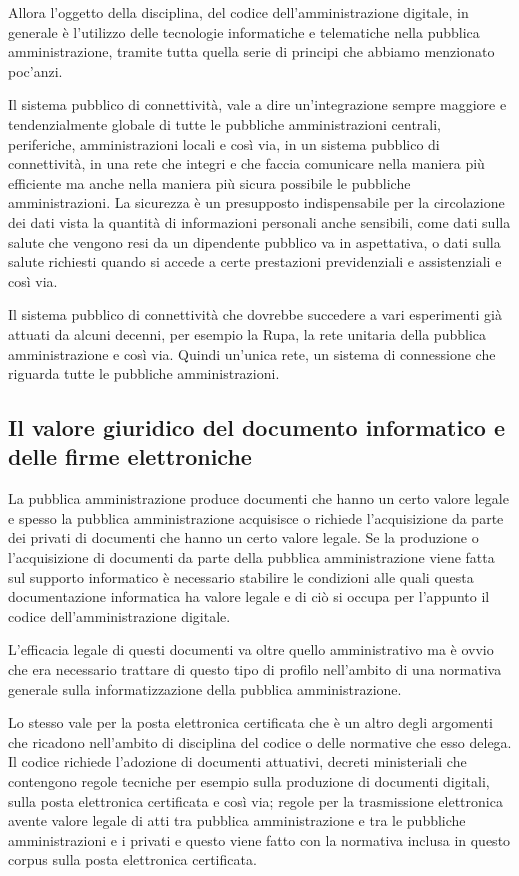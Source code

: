 Allora l'oggetto della disciplina, del codice dell'amministrazione digitale, in generale è l'utilizzo delle tecnologie informatiche e telematiche nella pubblica amministrazione, tramite tutta quella serie di principi che abbiamo menzionato poc'anzi. 

Il sistema pubblico di connettività, vale a dire un'integrazione sempre maggiore e tendenzialmente globale di tutte le pubbliche amministrazioni centrali, periferiche, amministrazioni locali e così via, in un sistema pubblico di connettività, in una rete che integri e che faccia comunicare nella maniera più efficiente ma anche nella maniera più sicura possibile le pubbliche amministrazioni. 
La sicurezza è un presupposto indispensabile per la circolazione dei dati vista la quantità di informazioni personali anche sensibili, come dati sulla salute che vengono resi da un dipendente pubblico va in aspettativa, o dati sulla salute richiesti quando si accede a certe prestazioni previdenziali e assistenziali e così via.

Il sistema pubblico di connettività che dovrebbe succedere a vari esperimenti già attuati da alcuni decenni, per esempio la Rupa, la rete unitaria della pubblica amministrazione e così via. 
Quindi un'unica rete, un sistema di connessione che riguarda tutte le pubbliche amministrazioni. 

\subsection{Il valore giuridico del documento informatico e delle firme elettroniche}

La pubblica amministrazione produce documenti che hanno un certo valore legale e spesso la pubblica amministrazione acquisisce o richiede l'acquisizione da parte dei privati di documenti che hanno un certo valore legale. Se la produzione o l'acquisizione di documenti da parte della pubblica amministrazione viene fatta sul supporto informatico è necessario stabilire le condizioni alle quali questa documentazione informatica ha valore legale e di ciò si occupa per l'appunto il codice dell'amministrazione digitale.

L'efficacia legale di questi documenti va oltre quello amministrativo ma è ovvio che era necessario trattare di questo tipo di profilo nell'ambito di una normativa generale sulla informatizzazione della pubblica amministrazione. 

Lo stesso vale per la posta elettronica certificata che è un altro degli argomenti che ricadono nell'ambito di disciplina del codice o delle normative che esso delega. 
Il codice richiede l'adozione di documenti attuativi, decreti ministeriali che contengono regole tecniche per esempio sulla produzione di documenti digitali, sulla posta elettronica certificata e così via; regole per la trasmissione elettronica avente valore legale di atti tra pubblica amministrazione e tra le pubbliche amministrazioni e i privati e questo viene fatto con la normativa inclusa in questo corpus sulla posta elettronica certificata.


